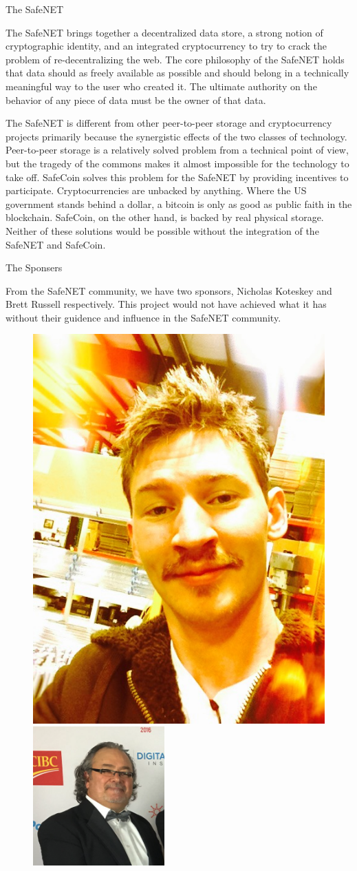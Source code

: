 \documentclass[final]{beamer}
\newlength{\onecolwid}
\begin{document}
\begin{frame}[t]
\begin{columns}[t]
\begin{column}{\onecolwid}
\begin{block}{The SafeNET}

  The SafeNET brings together a decentralized data store, a strong notion of
  cryptographic identity, and an integrated cryptocurrency to try to crack
  the problem of re-decentralizing the web. The core philosophy of the SafeNET
  holds that data should as freely available as possible and should belong in a
  technically meaningful way to the user who created it. The ultimate authority
  on the behavior of any piece of data must be the owner of that data.

  \par

  The SafeNET is different from other peer-to-peer storage and cryptocurrency projects
  primarily because the synergistic effects of the two classes of technology.
  Peer-to-peer storage is a relatively solved problem from a technical point of view,
  but the tragedy of the commons makes it almost impossible for the technology to
  take off. SafeCoin solves this problem for the SafeNET by providing incentives to
  participate. Cryptocurrencies are unbacked by anything. Where the US government
  stands behind a dollar, a bitcoin is only as good as public faith in the blockchain.
  SafeCoin, on the other hand, is backed by real physical storage. Neither of these
  solutions would be possible without the integration of the SafeNET and SafeCoin.


\end{block}

\begin{block}{The Sponsers}

  From the SafeNET community, we have two sponsors, Nicholas Koteskey and Brett Russell
  respectively.
  This project would not have achieved what it has without their guidence and influence in
  the SafeNET community.

  \begin{figure}
  \includegraphics[width=0.2\linewidth]{nick.jpg}
  \:\:\:\:\:
  \includegraphics[width=0.2\linewidth]{brett.png}
  \end{figure}


\end{block}
\end{column}
\end{columns}
\end{frame}
\end{document}
